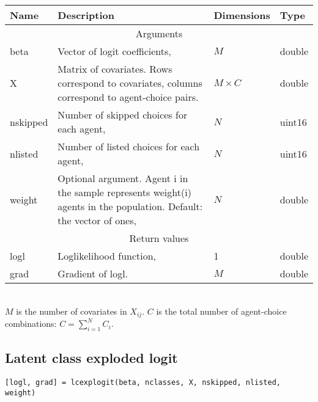\documentclass[12pt]{article}
\begin{document}
\begin{tabular}{lp{}ll}\\\hline\hline
	Name 		& Description & Dimensions & Type\\\hline
	\multicolumn{4}{c}{Arguments}\\\hline
	beta 		& Vector of logit coefficients, & $M$ & double\\
	X 			& Matrix of covariates. Rows correspond to covariates, columns correspond to agent-choice pairs. & $M\times C$ & double \\
	nskipped 	& Number of skipped choices for each agent, & $N$ & uint16 \\
	nlisted 	& Number of listed choices for each agent, & $N$ & uint16 \\
	weight		& Optional argument. Agent i in the sample represents weight(i) agents in the population. Default: the vector of ones, & $N$ & double\\\hline
	
	\multicolumn{4}{c}{Return values}\\\hline
	logl		& Loglikelihood function, & 1 & double\\
	grad		& Gradient of logl. & $M$ & double\\\hline\hline
\end{tabular}\\

$M$ is the number of covariates in $X_{ij}$. $C$ is the total number of agent-choice combinations: $C=\sum_{i=1}^NC_i$.
\clearpage
\subsection{Latent class exploded logit}

\texttt{[logl, grad] = lcexplogit(beta, nclasses, X, nskipped, nlisted, weight)}
\end{document}
